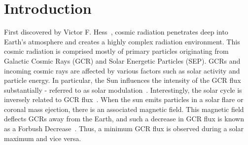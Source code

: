 \section{Introduction}
\label{Introduction}
First discovered by Victor F. Hess~\cite{hess}, cosmic radiation penetrates deep into Earth's atmosphere and creates a highly complex radiation environment.  This cosmic radiation is comprised mostly of primary particles originating from Galactic Cosmic Rays (GCR) and Solar Energetic Particles (SEP).  GCRs and incoming cosmic rays are affected by various factors such as solar activity and particle energy.
In particular, the Sun influences the intensity of the GCR flux substantially - referred to as solar modulation~\cite{abe}. Interestingly, the solar cycle is inversely related to GCR flux~\cite{hathaway}. When the sun emits particles in a solar flare or coronal mass ejection, there is an associated magnetic field. This magnetic field deflects GCRs away from the Earth, and such a decrease in GCR flux is known as a Forbush Decrease~\cite{forbush-decrease}. Thus, a minimum GCR flux is observed during a solar maximum and vice versa.   

